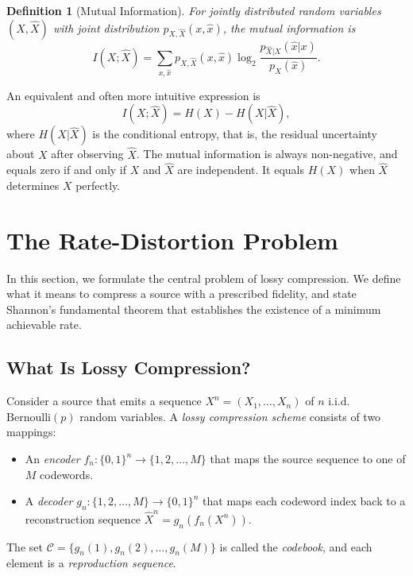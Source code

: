 \documentclass[11pt]{article}
\newtheorem{definition}{Definition}[section]
\newcommand{\Ber}{\mathrm{Bernoulli}}
\begin{document}
\begin{definition}[Mutual Information]
\label{def:mutual_info}
For jointly distributed random variables $(X, \hat{X})$ with joint distribution
$p_{X,\hat{X}}(x, \hat{x})$, the mutual information is
\begin{equation}
\label{eq:mutual_info}
I(X; \hat{X}) = \sum_{x, \hat{x}} p_{X,\hat{X}}(x, \hat{x})
\log_2 \frac{p_{\hat{X}|X}(\hat{x}|x)}{p_{\hat{X}}(\hat{x})}.
\end{equation}
\end{definition}

An equivalent and often more intuitive expression is
\begin{equation}
\label{eq:mi_entropy}
I(X; \hat{X}) = H(X) - H(X | \hat{X}),
\end{equation}
where $H(X|\hat{X})$ is the conditional entropy, that is, the residual uncertainty
about $X$ after observing $\hat{X}$.
The mutual information is always non-negative, and equals zero if and only if
$X$ and $\hat{X}$ are independent.
It equals $H(X)$ when $\hat{X}$ determines $X$ perfectly.


\section{The Rate-Distortion Problem}
\label{sec:rd_problem}

In this section, we formulate the central problem of lossy compression.
We define what it means to compress a source with a prescribed fidelity, and
state Shannon's fundamental theorem that establishes the existence of a minimum
achievable rate.

\subsection{What Is Lossy Compression?}
\label{subsec:lossy}

Consider a source that emits a sequence $X^n = (X_1, \ldots, X_n)$ of $n$
i.i.d.\ $\Ber(p)$ random variables.
A \emph{lossy compression scheme} consists of two mappings:
\begin{itemize}
    \item An \emph{encoder} $f_n : \{0,1\}^n \to \{1, 2, \ldots, M\}$ that maps
          the source sequence to one of $M$ codewords.
    \item A \emph{decoder} $g_n : \{1, 2, \ldots, M\} \to \{0,1\}^n$ that maps
          each codeword index back to a reconstruction sequence
          $\hat{X}^n = g_n(f_n(X^n))$.
\end{itemize}
The set $\mathcal{C} = \{g_n(1), g_n(2), \ldots, g_n(M)\}$ is called the
\emph{codebook}, and each element is a \emph{reproduction sequence}.
\end{document}
